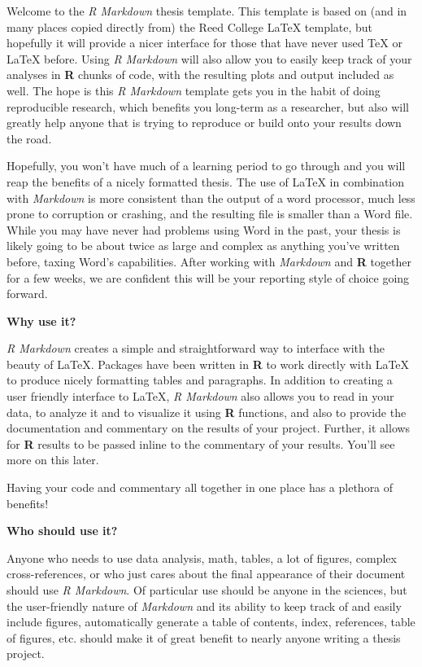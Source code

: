 \documentclass[12pt,twoside]{dukestatscithesis}
\theoremstyle{definition}
\theoremstyle{definition}
\theoremstyle{definition}
\theoremstyle{remark}
\begin{document}
Welcome to the \emph{R Markdown} thesis template. This template is based
on (and in many places copied directly from) the Reed College LaTeX
template, but hopefully it will provide a nicer interface for those that
have never used TeX or LaTeX before. Using \emph{R Markdown} will also
allow you to easily keep track of your analyses in \textbf{R} chunks of
code, with the resulting plots and output included as well. The hope is
this \emph{R Markdown} template gets you in the habit of doing
reproducible research, which benefits you long-term as a researcher, but
also will greatly help anyone that is trying to reproduce or build onto
your results down the road.

Hopefully, you won't have much of a learning period to go through and
you will reap the benefits of a nicely formatted thesis. The use of
LaTeX in combination with \emph{Markdown} is more consistent than the
output of a word processor, much less prone to corruption or crashing,
and the resulting file is smaller than a Word file. While you may have
never had problems using Word in the past, your thesis is likely going
to be about twice as large and complex as anything you've written
before, taxing Word's capabilities. After working with \emph{Markdown}
and \textbf{R} together for a few weeks, we are confident this will be
your reporting style of choice going forward.

\textbf{Why use it?}

\emph{R Markdown} creates a simple and straightforward way to interface
with the beauty of LaTeX. Packages have been written in \textbf{R} to
work directly with LaTeX to produce nicely formatting tables and
paragraphs. In addition to creating a user friendly interface to LaTeX,
\emph{R Markdown} also allows you to read in your data, to analyze it
and to visualize it using \textbf{R} functions, and also to provide the
documentation and commentary on the results of your project. Further, it
allows for \textbf{R} results to be passed inline to the commentary of
your results. You'll see more on this later.

Having your code and commentary all together in one place has a plethora
of benefits!

\textbf{Who should use it?}

Anyone who needs to use data analysis, math, tables, a lot of figures,
complex cross-references, or who just cares about the final appearance
of their document should use \emph{R Markdown}. Of particular use should
be anyone in the sciences, but the user-friendly nature of
\emph{Markdown} and its ability to keep track of and easily include
figures, automatically generate a table of contents, index, references,
table of figures, etc. should make it of great benefit to nearly anyone
writing a thesis project.
\end{document}
